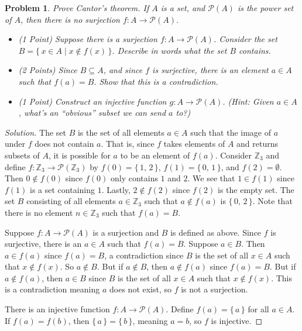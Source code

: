 \documentclass{article}
\theoremstyle{normal}
\newtheorem{problem}{Problem}
\begin{document}
    \color{blue}
    \begin{problem}
        Prove Cantor's theorem. If $A$ is a set, and $\mathcal{P}(A)$ is the
        power set of $A$, then there is no surjection
        $f:A\rightarrow\mathcal{P}(A)$.
        \begin{itemize}
            \item (1 Point) Suppose there is a surjection
                $f:A\rightarrow\mathcal{P}(A)$. Consider the set
                $B=\{\,x\in{A}\;|\;x\notin{f}(x)\,\}$. Describe in words what
                the set $B$ contains.
            \item (2 Points) Since $B\subseteq{A}$, and since $f$ is surjective,
                there is an element $a\in{A}$ such that $f(a)=B$. Show that
                this is a contradiction.
            \item (1 Point) Construct an injective function
                $g:A\rightarrow\mathcal{P}(A)$. (Hint: Given $a\in{A}$, what's
                an ``obvious'' subset we can send $a$ to?) 
        \end{itemize}
    \end{problem}
    \color{black}
    \begin{proof}[Solution]
        The set $B$ is the set of all elements $a\in{A}$ such that the image of
        $a$ under $f$ does not contain $a$. That is, since $f$ takes elements
        of $A$ and returns subsets of $A$, it is possible for $a$ to be
        an element of $f(a)$. Consider $\mathbb{Z}_{3}$ and define
        $f:\mathbb{Z}_{3}\rightarrow\mathcal{P}(\mathbb{Z}_{3})$ by
        $f(0)=\{\,1,\,2\,\}$, $f(1)=\{\,0,\,1\,\}$, and
        $f(2)=\emptyset$. Then $0\notin{f}(0)$ since $f(0)$ only contains
        $1$ and $2$. We see that $1\in{f}(1)$ since $f(1)$ is a set containing
        $1$. Lastly, $2\notin{f}(2)$ since $f(2)$ is the empty set. The set
        $B$ consisting of all elements $a\in\mathbb{Z}_{3}$ such that
        $a\notin{f}(a)$ is $\{\,0,\,2\,\}$. Note that there is no element
        $n\in\mathbb{Z}_{3}$ such that $f(a)=B$.
        \par\hfill\par
        Suppose $f:A\rightarrow\mathcal{P}(A)$ is a surjection and $B$ is
        defined as above. Since $f$ is surjective, there is an $a\in{A}$
        such that $f(a)=B$. Suppose $a\in{B}$. Then $a\in{f}(a)$ since
        $f(a)=B$, a contradiction since $B$ is the set of all $x\in{A}$ such
        that $x\notin{f}(x)$. So $a\notin{B}$. But if $a\notin{B}$, then
        $a\notin{f}(a)$ since $f(a)=B$. But if $a\notin{f}(a)$, then
        $a\in{B}$ since $B$ is the set of all $x\in{A}$ such that
        $x\notin{f}(x)$. This is a contradiction meaning $a$ does not exist, so
        $f$ is not a surjection.
        \par\hfill\par
        There is an injective function $f:A\rightarrow\mathcal{P}(A)$.
        Define $f(a)=\{\,a\,\}$ for all $a\in{A}$. If
        $f(a)=f(b)$, then $\{\,a\,\}=\{\,b\,\}$, meaning $a=b$, so $f$
        is injective.
    \end{proof}
    \clearpage
\end{document}
